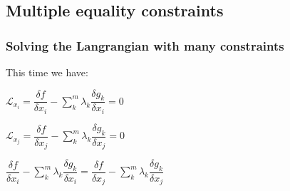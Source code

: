 
\subsection{Multiple equality constraints}

\subsubsection{Solving the Langrangian with many constraints}

This time we have:

\(\mathcal{L}_{x_i}=\dfrac{\delta f}{\delta x_i}-\sum^m_k\lambda_k \dfrac{\delta g_k}{\delta x_i}=0\)

\(\mathcal{L}_{x_j}=\dfrac{\delta f}{\delta x_j}-\sum^m_k\lambda_k \dfrac{\delta g_k}{\delta x_j}=0\)

\(\dfrac{\delta f}{\delta x_i}-\sum^m_k\lambda_k \dfrac{\delta g_k}{\delta x_i}=\dfrac{\delta f}{\delta x_j}-\sum^m_k\lambda_k \dfrac{\delta g_k}{\delta x_j}\)

